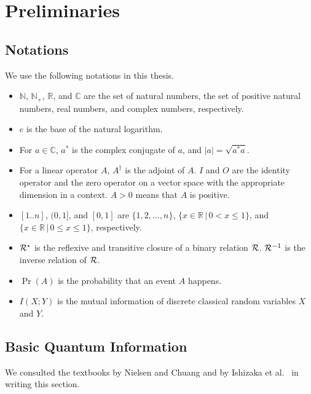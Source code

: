 \chapter{Preliminaries}
\label{prel}
\section{Notations}
We use the following notations in this thesis.
\begin{itemize}
 \item $\mathbb{N}$, $\mathbb{N}_+$, $\mathbb{R}$, and $\mathbb{C}$ are
       the set of natural numbers, the set of positive natural numbers, 
       real numbers, and complex numbers,
       respectively.
 \item $e$ is the base of the natural logarithm.
 \item For $a \in \mathbb{C}$, $a^\ast$ is the complex conjugate of
       $a$, and $|a| = \sqrt{a^\ast a}$.
 \item For a linear operator $A$, $A^\dagger$ is the adjoint of
       $A$. $I$ and $O$ are the identity operator and the zero operator
       on
       a vector space with the appropriate dimension in a context.
       $A > 0$ means that $A$ is positive.
 \item $[1..n]$, $(0,1]$, and $[0,1]$ are
       $\{1,2,...,n\}$, $\{x \in \mathbb{R}\,|\,0 < x \le 1\}$, and
       $\{x \in \mathbb{R}\,|\,0 \le x \le 1\}$, respectively.
 \item $\mathcal{R}^\ast$ is the reflexive and transitive closure of 
       a binary relation $\mathcal{R}$. $\mathcal{R}^{-1}$ is the inverse relation of
       $\mathcal{R}$.
 \item $\Pr(A)$ is the probability that an event $A$ happens.
 \item $I(X;Y)$ is the mutual information of discrete
       classical random variables $X$ and $Y$.
\end{itemize}

\section{Basic Quantum Information}
We consulted the textbooks by Nielsen and Chuang 
\cite[Part 1]{NielsenChuang-Kimura2004} and 
by Ishizaka et al.\ \cite{Ishizakaetal2012} in writing this section.
